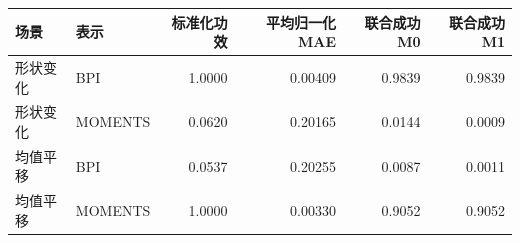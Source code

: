 \begin{tabular}{llrrrr}
\toprule
场景 & 表示 & 标准化功效 & 平均归一化MAE & 联合成功M0 & 联合成功M1 \\
\midrule
形状变化 & BPI & 1.0000 & 0.00409 & 0.9839 & 0.9839 \\
形状变化 & MOMENTS & 0.0620 & 0.20165 & 0.0144 & 0.0009 \\
均值平移 & BPI & 0.0537 & 0.20255 & 0.0087 & 0.0011 \\
均值平移 & MOMENTS & 1.0000 & 0.00330 & 0.9052 & 0.9052 \\
\bottomrule
\end{tabular}

